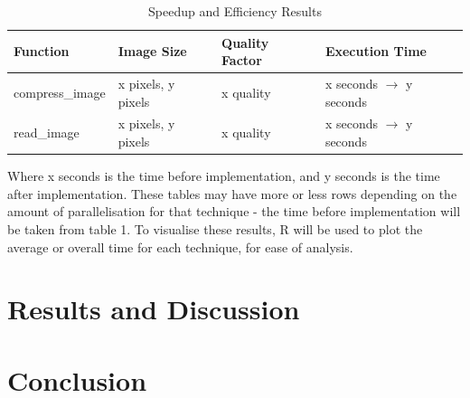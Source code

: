 \documentclass[12pt, a4paper]{article}
\begin{document}
\begin{table}[H]
    \centering
    \begin{tabular}{| l | l | l | l |}
    \hline
    Function & Image Size & Quality Factor & Execution Time \\ \hline
    compress\_image & x pixels, y pixels & x quality & x seconds $\rightarrow$ y seconds \\ \hline
    read\_image  & x pixels, y pixels & x quality & x seconds $\rightarrow$ y seconds \\ \hline
    \end{tabular}
    \caption{Speedup and Efficiency Results}
\end{table}

Where x seconds is the time before implementation, and y seconds is the time after implementation. These tables may have more or less rows depending on the amount of parallelisation for that technique - the time before implementation will be taken from table 1. To visualise these results, R will be used to plot the average or overall time for each technique, for ease of analysis.

\section{Results and Discussion}

\section{Conclusion}

\newpage


{}
\nocite{*}
\end{document}
